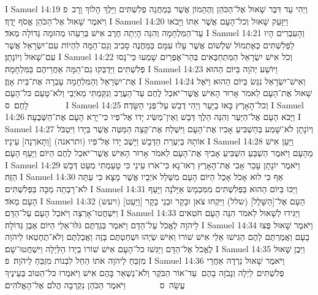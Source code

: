 I Samuel 14:19	וַיְהִי עַד דִּבֶּר שָׁאוּל אֶל־הַכֹּהֵן וְהֶהָמוֹן אֲשֶׁר בְּמַחֲנֵה פְלִשְׁתִּים וַיֵּלֶךְ הָלוֹךְ וָרָב {פ} וַיֹּאמֶר שָׁאוּל אֶל־הַכֹּהֵן אֱסֹף יָדֶךָ׃
I Samuel 14:20	וַיִּזָּעֵק שָׁאוּל וְכל־הָעָם אֲשֶׁר אִתּוֹ וַיָּבֹאוּ עַד־הַמִּלְחָמָה וְהִנֵּה הָיְתָה חֶרֶב אִישׁ בְּרֵעֵהוּ מְהוּמָה גְּדוֹלָה מְאֹד׃
I Samuel 14:21	וְהָעִבְרִים הָיוּ לַפְּלִשְׁתִּים כְּאֶתְמוֹל שִׁלְשׁוֹם אֲשֶׁר עָלוּ עִמָּם בַּמַּחֲנֶה סָבִיב וְגַם־הֵמָּה לִהְיוֹת עִם־יִשְׂרָאֵל אֲשֶׁר עִם־שָׁאוּל וְיוֹנָתָן׃
I Samuel 14:22	וְכֹל אִישׁ יִשְׂרָאֵל הַמִּתְחַבְּאִים בְּהַר־אֶפְרַיִם שָׁמְעוּ כִּי־נָסוּ פְּלִשְׁתִּים וַיַּדְבְּקוּ גַם־הֵמָּה אַחֲרֵיהֶם בַּמִּלְחָמָה׃
I Samuel 14:23	וַיּוֹשַׁע יְהֹוָה בַּיּוֹם הַהוּא אֶת־יִשְׂרָאֵל וְהַמִּלְחָמָה עָבְרָה אֶת־בֵּית אָוֶן׃
I Samuel 14:24	וְאִישׁ־יִשְׂרָאֵל נִגַּשׂ בַּיּוֹם הַהוּא וַיֹּאֶל שָׁאוּל אֶת־הָעָם לֵאמֹר אָרוּר הָאִישׁ אֲשֶׁר־יֹאכַל לֶחֶם עַד־הָעֶרֶב וְנִקַּמְתִּי מֵאֹיְבַי וְלֹא־טָעַם כּל־הָעָם לָחֶם׃ {ס}        
I Samuel 14:25	וְכל־הָאָרֶץ בָּאוּ בַיָּעַר וַיְהִי דְבַשׁ עַל־פְּנֵי הַשָּׂדֶה׃
I Samuel 14:26	וַיָּבֹא הָעָם אֶל־הַיַּעַר וְהִנֵּה הֵלֶךְ דְּבָשׁ וְאֵין־מַשִּׂיג יָדוֹ אֶל־פִּיו כִּי־יָרֵא הָעָם אֶת־הַשְּׁבֻעָה׃
I Samuel 14:27	וְיוֹנָתָן לֹא־שָׁמַע בְּהַשְׁבִּיעַ אָבִיו אֶת־הָעָם וַיִּשְׁלַח אֶת־קְצֵה הַמַּטֶּה אֲשֶׁר בְּיָדוֹ וַיִּטְבֹּל אוֹתָהּ בְּיַעְרַת הַדְּבָשׁ וַיָּשֶׁב יָדוֹ אֶל־פִּיו (ותראנה) [וַתָּאֹרְנָה] עֵינָיו׃
I Samuel 14:28	וַיַּעַן אִישׁ מֵהָעָם וַיֹּאמֶר הַשְׁבֵּעַ הִשְׁבִּיעַ אָבִיךָ אֶת־הָעָם לֵאמֹר אָרוּר הָאִישׁ אֲשֶׁר־יֹאכַל לֶחֶם הַיּוֹם וַיָּעַף הָעָם׃
I Samuel 14:29	וַיֹּאמֶר יוֹנָתָן עָכַר אָבִי אֶת־הָאָרֶץ רְאוּ־נָא כִּי־אֹרוּ עֵינַי כִּי טָעַמְתִּי מְעַט דְּבַשׁ הַזֶּה׃
I Samuel 14:30	אַף כִּי לוּא אָכֹל אָכַל הַיּוֹם הָעָם מִשְּׁלַל אֹיְבָיו אֲשֶׁר מָצָא כִּי עַתָּה לֹא־רָבְתָה מַכָּה בַּפְּלִשְׁתִּים׃
I Samuel 14:31	וַיַּכּוּ בַּיּוֹם הַהוּא בַּפְּלִשְׁתִּים מִמִּכְמָשׂ אַיָּלֹנָה וַיָּעַף הָעָם מְאֹד׃
I Samuel 14:32	(ויעש) [וַיַּעַט] הָעָם אֶל־[הַשָּׁלָל] (שלל) וַיִּקְחוּ צֹאן וּבָקָר וּבְנֵי בָקָר וַיִּשְׁחֲטוּ־אָרְצָה וַיֹּאכַל הָעָם עַל־הַדָּם׃
I Samuel 14:33	וַיַּגִּידוּ לְשָׁאוּל לֵאמֹר הִנֵּה הָעָם חֹטִאים לַיהֹוָה לֶאֱכֹל עַל־הַדָּם וַיֹּאמֶר בְּגַדְתֶּם גֹּלּוּ־אֵלַי הַיּוֹם אֶבֶן גְּדוֹלָה׃
I Samuel 14:34	וַיֹּאמֶר שָׁאוּל פֻּצוּ בָעָם וַאֲמַרְתֶּם לָהֶם הַגִּישׁוּ אֵלַי אִישׁ שׁוֹרוֹ וְאִישׁ שְׂיֵהוּ וּשְׁחַטְתֶּם בָּזֶה וַאֲכַלְתֶּם וְלֹא־תֶחֶטְאוּ לַיהֹוָה לֶאֱכֹל אֶל־הַדָּם וַיַּגִּשׁוּ כל־הָעָם אִישׁ שׁוֹרוֹ בְיָדוֹ הַלַּיְלָה וַיִּשְׁחֲטוּ־שָׁם׃
I Samuel 14:35	וַיִּבֶן שָׁאוּל מִזְבֵּחַ לַיהֹוָה אֹתוֹ הֵחֵל לִבְנוֹת מִזְבֵּחַ לַיהֹוָה׃ {פ}
I Samuel 14:36	וַיֹּאמֶר שָׁאוּל נֵרְדָה אַחֲרֵי פְלִשְׁתִּים  לַיְלָה וְנָבֹזָה בָהֶם  עַד־אוֹר הַבֹּקֶר וְלֹא־נַשְׁאֵר בָּהֶם אִישׁ וַיֹּאמְרוּ כּל־הַטּוֹב בְּעֵינֶיךָ עֲשֵׂה {ס}        וַיֹּאמֶר הַכֹּהֵן נִקְרְבָה הֲלֹם אֶל־הָאֱלֹהִים׃
